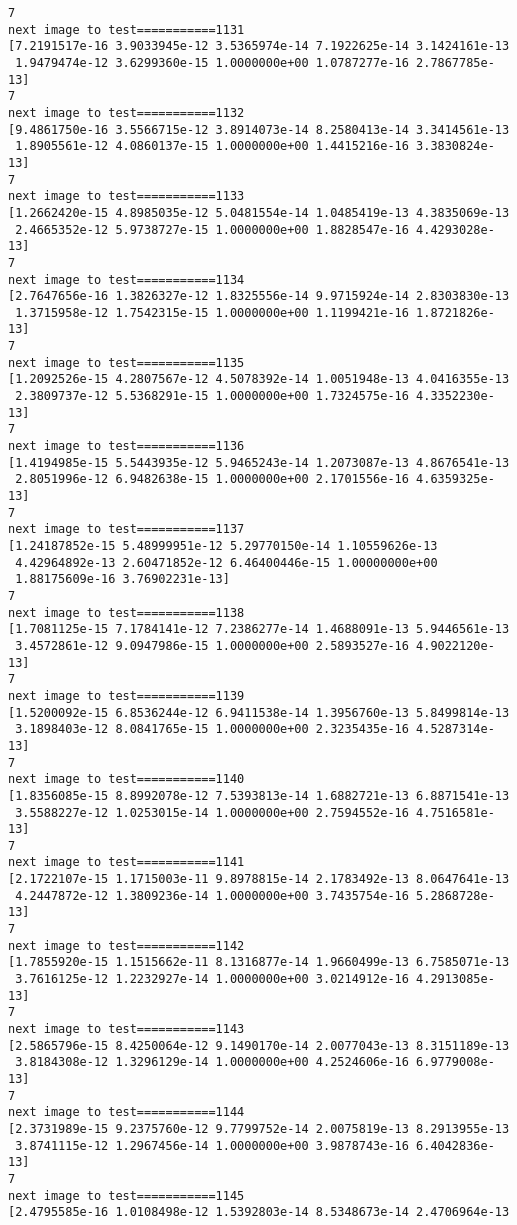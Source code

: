 \documentclass[11pt]{article}
\begin{document}
\begin{Verbatim}[commandchars=\\\{\}]
7
next image to test===========1131
[7.2191517e-16 3.9033945e-12 3.5365974e-14 7.1922625e-14 3.1424161e-13
 1.9479474e-12 3.6299360e-15 1.0000000e+00 1.0787277e-16 2.7867785e-13]
7
next image to test===========1132
[9.4861750e-16 3.5566715e-12 3.8914073e-14 8.2580413e-14 3.3414561e-13
 1.8905561e-12 4.0860137e-15 1.0000000e+00 1.4415216e-16 3.3830824e-13]
7
next image to test===========1133
[1.2662420e-15 4.8985035e-12 5.0481554e-14 1.0485419e-13 4.3835069e-13
 2.4665352e-12 5.9738727e-15 1.0000000e+00 1.8828547e-16 4.4293028e-13]
7
next image to test===========1134
[2.7647656e-16 1.3826327e-12 1.8325556e-14 9.9715924e-14 2.8303830e-13
 1.3715958e-12 1.7542315e-15 1.0000000e+00 1.1199421e-16 1.8721826e-13]
7
next image to test===========1135
[1.2092526e-15 4.2807567e-12 4.5078392e-14 1.0051948e-13 4.0416355e-13
 2.3809737e-12 5.5368291e-15 1.0000000e+00 1.7324575e-16 4.3352230e-13]
7
next image to test===========1136
[1.4194985e-15 5.5443935e-12 5.9465243e-14 1.2073087e-13 4.8676541e-13
 2.8051996e-12 6.9482638e-15 1.0000000e+00 2.1701556e-16 4.6359325e-13]
7
next image to test===========1137
[1.24187852e-15 5.48999951e-12 5.29770150e-14 1.10559626e-13
 4.42964892e-13 2.60471852e-12 6.46400446e-15 1.00000000e+00
 1.88175609e-16 3.76902231e-13]
7
next image to test===========1138
[1.7081125e-15 7.1784141e-12 7.2386277e-14 1.4688091e-13 5.9446561e-13
 3.4572861e-12 9.0947986e-15 1.0000000e+00 2.5893527e-16 4.9022120e-13]
7
next image to test===========1139
[1.5200092e-15 6.8536244e-12 6.9411538e-14 1.3956760e-13 5.8499814e-13
 3.1898403e-12 8.0841765e-15 1.0000000e+00 2.3235435e-16 4.5287314e-13]
7
next image to test===========1140
[1.8356085e-15 8.8992078e-12 7.5393813e-14 1.6882721e-13 6.8871541e-13
 3.5588227e-12 1.0253015e-14 1.0000000e+00 2.7594552e-16 4.7516581e-13]
7
next image to test===========1141
[2.1722107e-15 1.1715003e-11 9.8978815e-14 2.1783492e-13 8.0647641e-13
 4.2447872e-12 1.3809236e-14 1.0000000e+00 3.7435754e-16 5.2868728e-13]
7
next image to test===========1142
[1.7855920e-15 1.1515662e-11 8.1316877e-14 1.9660499e-13 6.7585071e-13
 3.7616125e-12 1.2232927e-14 1.0000000e+00 3.0214912e-16 4.2913085e-13]
7
next image to test===========1143
[2.5865796e-15 8.4250064e-12 9.1490170e-14 2.0077043e-13 8.3151189e-13
 3.8184308e-12 1.3296129e-14 1.0000000e+00 4.2524606e-16 6.9779008e-13]
7
next image to test===========1144
[2.3731989e-15 9.2375760e-12 9.7799752e-14 2.0075819e-13 8.2913955e-13
 3.8741115e-12 1.2967456e-14 1.0000000e+00 3.9878743e-16 6.4042836e-13]
7
next image to test===========1145
[2.4795585e-16 1.0108498e-12 1.5392803e-14 8.5348673e-14 2.4706964e-13

\end{Verbatim}
\end{document}
